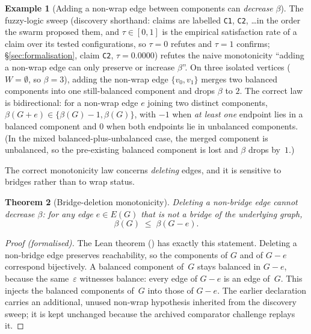 \documentclass[11pt,a4paper]{amsart}
\theoremstyle{plain}
\newtheorem{theorem}{Theorem}[section]
\theoremstyle{definition}
\newtheorem{example}[theorem]{Example}
\theoremstyle{remark}
\begin{document}
\begin{example}[Adding a non-wrap edge between components can
\emph{decrease} $\beta$]\label{ex:cross-merge}
The fuzzy-logic sweep (discovery shorthand: claims are labelled
\texttt{C1}, \texttt{C2}, \dots in the order the swarm proposed them,
and $\tau\in[0,1]$ is the empirical satisfaction rate of a claim over
its tested configurations, so $\tau=0$ refutes and $\tau=1$ confirms;
\S\ref{sec:formalisation}, claim \texttt{C2}, $\tau=0.0000$) refutes
the naive monotonicity
``adding a non-wrap edge can only preserve or increase
$\beta$''. On three isolated vertices ($W=\emptyset$, so
$\beta=3$), adding the non-wrap edge $\{v_0,v_1\}$ merges two
balanced components into one still-balanced component and drops
$\beta$ to $2$. The correct law is bidirectional: for a non-wrap
edge $e$ joining two distinct components,
$\beta(G+e)\in\{\beta(G)-1,\beta(G)\}$, with $-1$ when \emph{at
least one} endpoint lies in a balanced component and $0$ when both
endpoints lie in unbalanced components. (In the mixed
balanced-plus-unbalanced case, the merged component is unbalanced,
so the pre-existing balanced component is lost and $\beta$ drops
by~$1$.)
\end{example}

The correct monotonicity law concerns \emph{deleting} edges, and it is
sensitive to bridges rather than to wrap status.

\begin{theorem}[Bridge-deletion monotonicity]\label{thm:bridge-monotone}
Deleting a non-bridge edge cannot decrease $\beta$: for any edge
$e\in E(G)$ that is not a bridge of the underlying graph,
\[
  \beta(G) \;\le\; \beta(G - e).
\]
\end{theorem}

\begin{proof}[Proof (formalised)]
The Lean theorem 
() has exactly this statement. Deleting a
non-bridge edge preserves reachability, so the components of $G$ and
of $G-e$ correspond bijectively. A balanced component of~$G$ stays
balanced in $G-e$, because the same~$\varepsilon$ witnesses balance:
every edge of $G-e$ is an edge of~$G$. This injects the balanced
components of~$G$ into those of $G-e$. The earlier declaration
 carries
an additional, unused non-wrap hypothesis inherited from the discovery
sweep; it is kept unchanged because the archived comparator challenge
replays it.
\end{proof}
\end{document}
